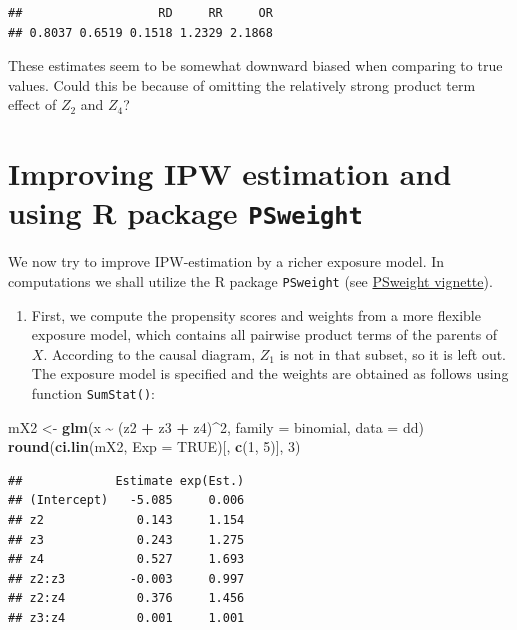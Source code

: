 \documentclass[
]{book}
\newenvironment{Shaded}{\begin{snugshade}}{\end{snugshade}}
\newcommand{\AttributeTok}[1]{\textcolor[rgb]{0.13,0.29,0.53}{#1}}
\newcommand{\ConstantTok}[1]{\textcolor[rgb]{0.56,0.35,0.01}{#1}}
\newcommand{\DecValTok}[1]{\textcolor[rgb]{0.00,0.00,0.81}{#1}}
\newcommand{\FunctionTok}[1]{\textcolor[rgb]{0.13,0.29,0.53}{\textbf{#1}}}
\newcommand{\NormalTok}[1]{#1}
\newcommand{\OtherTok}[1]{\textcolor[rgb]{0.56,0.35,0.01}{#1}}
\newcommand{\SpecialCharTok}[1]{\textcolor[rgb]{0.81,0.36,0.00}{\textbf{#1}}}
\providecommand{\tightlist}{%
  \setlength{\itemsep}{0pt}\setlength{\parskip}{0pt}}
\begin{document}
\begin{verbatim}
##                   RD     RR     OR 
## 0.8037 0.6519 0.1518 1.2329 2.1868
\end{verbatim}

These estimates seem to be somewhat downward biased when
comparing to
true values. Could this be because of omitting
the relatively strong
product term effect of \(Z_2\) and \(Z_4\)?

\section{\texorpdfstring{Improving IPW estimation and using R package \texttt{PSweight}}{Improving IPW estimation and using R package PSweight}}\label{improving-ipw-estimation-and-using-r-package-psweight}

We now try to improve IPW-estimation by a richer exposure
model. In
computations we shall utilize the R package
\texttt{PSweight} (see \href{https://cran.r-project.org/web/packages/PSweight/vignettes/vignette.pdf}{PSweight
vignette}).

\begin{enumerate}
\def\labelenumi{\arabic{enumi}.}
\tightlist
\item
  First, we compute the propensity scores
  and weights from a more flexible exposure model,
  which contains all pairwise product terms
  of the parents of \(X\).
  According to the causal diagram, \(Z_1\) is
  not in that subset, so it
  is left out. The exposure model is
  specified and the weights are
  obtained as follows using function
  \texttt{SumStat()}:
\end{enumerate}

\begin{Shaded}
\begin{Highlighting}[]
\NormalTok{mX2 }\OtherTok{\textless{}{-}} \FunctionTok{glm}\NormalTok{(x }\SpecialCharTok{\textasciitilde{}}\NormalTok{ (z2 }\SpecialCharTok{+}\NormalTok{ z3 }\SpecialCharTok{+}\NormalTok{ z4)}\SpecialCharTok{\^{}}\DecValTok{2}\NormalTok{, }\AttributeTok{family =}\NormalTok{ binomial, }\AttributeTok{data =}\NormalTok{ dd)}
\FunctionTok{round}\NormalTok{(}\FunctionTok{ci.lin}\NormalTok{(mX2, }\AttributeTok{Exp =} \ConstantTok{TRUE}\NormalTok{)[, }\FunctionTok{c}\NormalTok{(}\DecValTok{1}\NormalTok{, }\DecValTok{5}\NormalTok{)], }\DecValTok{3}\NormalTok{)}
\end{Highlighting}
\end{Shaded}

\begin{verbatim}
##             Estimate exp(Est.)
## (Intercept)   -5.085     0.006
## z2             0.143     1.154
## z3             0.243     1.275
## z4             0.527     1.693
## z2:z3         -0.003     0.997
## z2:z4          0.376     1.456
## z3:z4          0.001     1.001
\end{verbatim}
\end{document}

